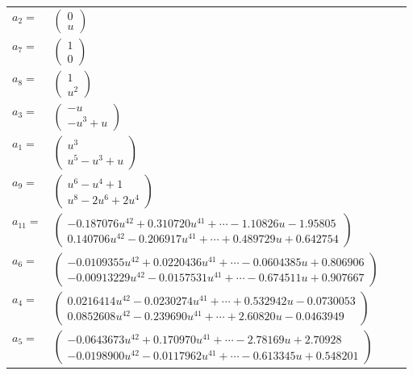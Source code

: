 \documentclass[1p]{elsarticle_modified}
\theoremstyle{definition}
\begin{document}
\begin{tabular}{m{7pt} m{180pt} m{7pt} m{180pt} }
\flushright $a_{2}=$&$\begin{pmatrix}0\\u\end{pmatrix}$ \\
\flushright $a_{7}=$&$\begin{pmatrix}1\\0\end{pmatrix}$ \\
\flushright $a_{8}=$&$\begin{pmatrix}1\\u^2\end{pmatrix}$ \\
\flushright $a_{3}=$&$\begin{pmatrix}- u\\- u^3+u\end{pmatrix}$ \\
\flushright $a_{1}=$&$\begin{pmatrix}u^3\\u^5- u^3+u\end{pmatrix}$ \\
\flushright $a_{9}=$&$\begin{pmatrix}u^6- u^4+1\\u^8-2 u^6+2 u^4\end{pmatrix}$ \\
\flushright $a_{11}=$&$\begin{pmatrix}-0.187076 u^{42}+0.310720 u^{41}+\cdots-1.10826 u-1.95805\\0.140706 u^{42}-0.206917 u^{41}+\cdots+0.489729 u+0.642754\end{pmatrix}$ \\
\flushright $a_{6}=$&$\begin{pmatrix}-0.0109355 u^{42}+0.0220436 u^{41}+\cdots-0.0604385 u+0.806906\\-0.00913229 u^{42}-0.0157531 u^{41}+\cdots-0.674511 u+0.907667\end{pmatrix}$ \\
\flushright $a_{4}=$&$\begin{pmatrix}0.0216414 u^{42}-0.0230274 u^{41}+\cdots+0.532942 u-0.0730053\\0.0852608 u^{42}-0.239690 u^{41}+\cdots+2.60820 u-0.0463949\end{pmatrix}$ \\
\flushright $a_{5}=$&$\begin{pmatrix}-0.0643673 u^{42}+0.170970 u^{41}+\cdots-2.78169 u+2.70928\\-0.0198900 u^{42}-0.0117962 u^{41}+\cdots-0.613345 u+0.548201\end{pmatrix}$ \\

\end{tabular}
\end{document}
